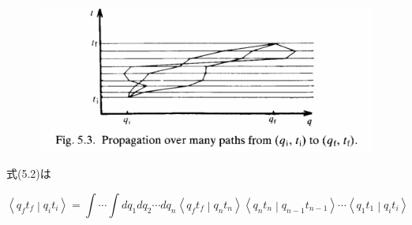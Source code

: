\documentclass{jsarticle}
\newcommand{\braket}[2]{\left\langle #1\middle|#2\right\rangle}
\begin{document}
\begin{figure}[H]
    \centering
    \includegraphics[width=\textwidth]{figure/fig5-3.png}
\end{figure}

式(5.2)は

\begin{equation*}
    \braket{q_{f}t_{f}}{q_{i}t_{i}} = \int \cdots \int dq_{1}dq_{2} \cdots dq_{n} \braket{q_{f}t_{f}}{q_{n}t_{n}}\braket{q_{n}t_{n}}{q_{n-1}t_{n-1}} \cdots \braket{q_{1}t_{1}}{q_{i}t_{i}} \tag{5.6}
\end{equation*}
\end{document}
